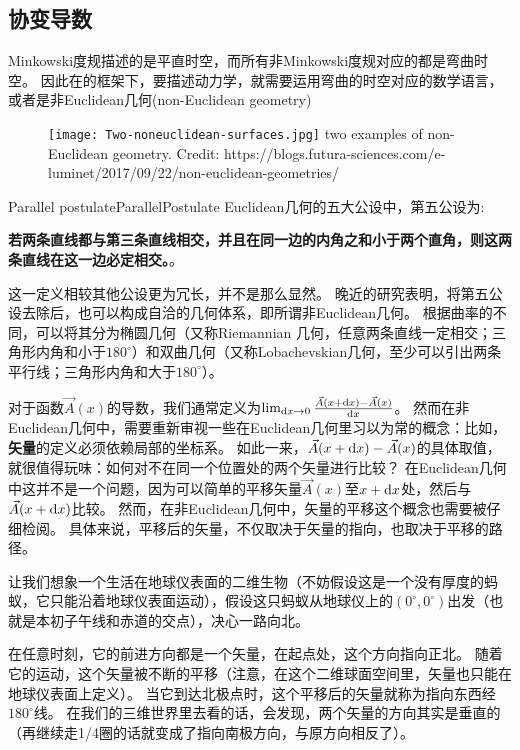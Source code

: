 \subsection{协变导数} 
Minkowski度规描述的是平直时空，而所有非Minkowski度规对应的都是弯曲时空。
因此在\GR 的框架下，要描述动力学，就需要运用弯曲的时空对应的数学语言，或者是非Euclidean几何(non-Euclidean geometry)
\begin{figure}[htp]
\centering
\texttt{[image: Two-noneuclidean-surfaces.jpg]}
  {two examples of non-Euclidean geometry. Credit: https://blogs.futura-sciences.com/e-luminet/2017/09/22/non-euclidean-geometries/}
\label{fig:nonEuclidean}
\end{figure}

\begin{myprop}{Parallel postulate}{ParallelPostulate}
  Euclidean几何的五大公设中，第五公设为:

  {\textbf{若两条直线都与第三条直线相交，并且在同一边的内角之和小于两个直角，则这两条直线在这一边必定相交。}}。

  这一定义相较其他公设更为冗长，并不是那么显然。
  晚近的研究表明，将第五公设去除后，也可以构成自洽的几何体系，即所谓非Euclidean几何。
  根据曲率的不同，可以将其分为椭圆几何（又称Riemannian 几何，任意两条直线一定相交；三角形内角和小于$180^\circ$）和双曲几何（又称Lobachevskian几何，至少可以引出两条平行线；三角形内角和大于$180^\circ$）。
\end{myprop}

对于函数$\vec{A}(x)$的导数，我们通常定义为$\lim_{{\rm d}x \to 0}\frac{\vec{A}(x+{\rm d}x)-\vec{A}(x)}{{\rm d}x}$。
然而在非Euclidean几何中，需要重新审视一些在Euclidean几何里习以为常的概念：比如，{\textbf{矢量}}的定义必须依赖局部的坐标系。
如此一来，$\vec{A}(x+{\rm d}x)-\vec{A}(x)$的具体取值，就很值得玩味：如何对不在同一个位置处的两个矢量进行比较？
在Euclidean几何中这并不是一个问题，因为可以简单的平移矢量$\vec{A}(x)$至$x+{\rm d}x$处，然后与$\vec{A}(x+{\rm d}x)$比较。
然而，在非Euclidean几何中，矢量的平移这个概念也需要被仔细检阅。
具体来说，平移后的矢量，不仅取决于矢量的指向，也取决于平移的路径。

\begin{example}

让我们想象一个生活在地球仪表面的二维生物（不妨假设这是一个没有厚度的蚂蚁，它只能沿着地球仪表面运动），假设这只蚂蚁从地球仪上的$(0^\circ,0^\circ)$出发（也就是本初子午线和赤道的交点），决心一路向北。

在任意时刻，它的前进方向都是一个矢量，在起点处，这个方向指向正北。
随着它的运动，这个矢量被不断的平移（注意，在这个二维球面空间里，矢量也只能在地球仪表面上定义）。
当它到达北极点时，这个平移后的矢量就称为指向东西经$180^\circ$线。
在我们的三维世界里去看的话，会发现，两个矢量的方向其实是垂直的（再继续走1/4圈的话就变成了指向南极方向，与原方向相反了）。
\end{example}

